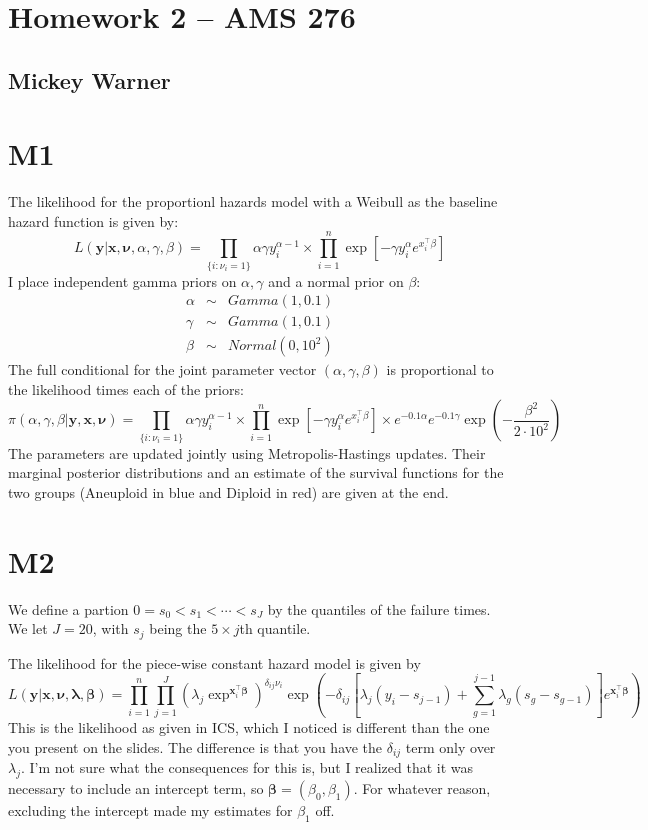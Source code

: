\documentclass[12pt]{article}
\newcommand{\m}[1]{\mathbf{\bm{#1}}}
\begin{document}
\section*{Homework 2 -- AMS 276}
\subsection*{Mickey Warner}
\bigskip
\bigskip

\section*{M1}

\noindent The likelihood for the proportionl hazards model with a Weibull as the baseline hazard function is given by:
\[ L(\m{y}|\m{x},\m{\nu},\alpha,\gamma,\beta) = \prod_{\{i:\nu_i=1\}} \alpha\gamma y_i^{\alpha-1} \times \prod_{i=1}^n\exp\left[-\gamma y_i^\alpha e^{x_i^\top\beta}\right] \]
\noindent I place independent gamma priors on $\alpha,\gamma$ and a normal prior on $\beta$:
\begin{eqnarray*}
\alpha &\sim& Gamma(1, 0.1) \\
\gamma &\sim& Gamma(1, 0.1) \\
\beta &\sim& Normal(0, 10^2)
\end{eqnarray*}
\noindent The full conditional for the joint parameter vector $(\alpha, \gamma, \beta)$ is proportional to the likelihood times each of the priors:
\[ \pi(\alpha,\gamma,\beta|\m{y},\m{x},\m{\nu}) = \prod_{\{i:\nu_i=1\}} \alpha\gamma y_i^{\alpha-1} \times \prod_{i=1}^n\exp\left[-\gamma y_i^\alpha e^{x_i^\top\beta}\right]\times e^{-0.1\alpha}e^{-0.1\gamma}\exp\left(-\frac{\beta^2}{2\cdot10^2}\right) \]
\noindent The parameters are updated jointly using Metropolis-Hastings updates. Their marginal posterior distributions and an estimate of the survival functions for the two groups (Aneuploid in blue and Diploid in red) are given at the end.

\section*{M2}

\noindent We define a partion $0=s_0 < s_1 < \cdots < s_J$ by the quantiles of the failure times. We let $J=20$, with $s_j$ being the $5\times j$th quantile.
\bigskip

\noindent The likelihood for the piece-wise constant hazard model is given by
\[ L(\m{y}|\m{x},\m{\nu},\m{\lambda},\m{\beta}) = \prod_{i=1}^n\prod_{j=1}^J(\lambda_j\exp^{\m{x}_i^\top\m{\beta}})^{\delta_{ij}\nu_i}\exp\left(-\delta_{ij}\left[\lambda_j(y_i-s_{j-1})+\sum_{g=1}^{j-1}\lambda_g(s_g-s_{g-1})\right]e^{\m{x}_i^\top\m{\beta}}\right) \]
\noindent This is the likelihood as given in ICS, which I noticed is different than the one you present on the slides. The difference is that you have the $\delta_{ij}$ term only over $\lambda_j$. I'm not sure what the consequences for this is, but I realized that it was necessary to include an intercept term, so $\m{\beta}=(\beta_0,\beta_1)$. For whatever reason, excluding the intercept made my estimates for $\beta_1$ off.
\bigskip
\end{document}
